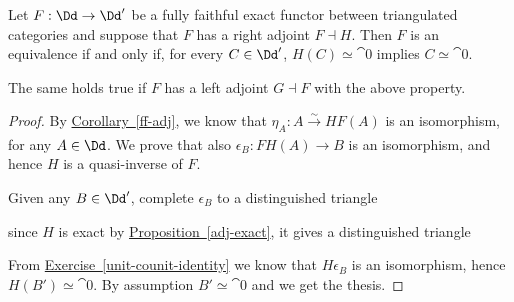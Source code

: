 \begin{lemma}\label{lemma-equiv}
    Let $F:\Dd \to \Dd'$ be a fully faithful exact functor
    between triangulated categories and suppose that $F$
    has a right adjoint $F \dashv H$.
    Then $F$ is an equivalence if and only if,
    for every $C \in \Dd'$, $H(C) \simeq \cat{0}$
    implies $C \simeq \cat{0}$.

    The same holds true if $F$ has a left adjoint $G \dashv F$
    with the above property.
    \begin{proof}
        By \hyperref[ff-adj]{Corollary~\ref*{ff-adj}},
        we know that $\eta_{A}:A \xrightarrow[]{\sim} HF(A)$ is an isomorphism,
        for any $A \in \Dd$. We prove that also $\epsilon_{B}:FH(A) \to B$ is
        an isomorphism, and hence $H$ is a quasi-inverse of $F$.

        Given any $B \in \Dd'$, complete $\epsilon_{B}$
        to a distinguished triangle
        \begin{center}
        \end{center}
        since $H$ is exact by \hyperref[adj-exact]{Proposition~\ref*{adj-exact}},
        it gives a distinguished triangle
        \begin{center}
        \end{center}
        From \hyperref[unit-counit-identity]{Exercise~\ref*{unit-counit-identity}}
        we know that $H\epsilon_{B}$ is an isomorphism, hence $H(B') \simeq \cat{0}$.
        By assumption $B' \simeq \cat{0}$ and we get the thesis.
    \end{proof}
\end{lemma}

